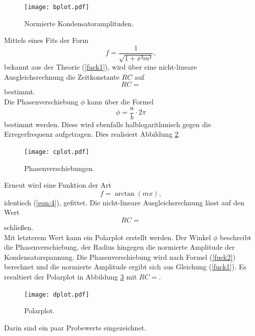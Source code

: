 \begin{figure}[H]
  \centering
  \texttt{[image: bplot.pdf]}
  \caption{Normierte Kondensatoramplituden.}
  \label{abb:3}
\end{figure}

Mittels eines Fits der Form
\begin{equation}
  f = \frac{1}{\sqrt{1+x²m²}},
\end{equation}
bekannt aus der Theorie (\ref{fuck1}), wird über eine nicht-lineare Ausgleichsrechnung die Zeitkonstante $RC$ auf
\begin{equation}
  RC = 
\end{equation}
bestimmt.\\
Die Phasenverschiebung $\phi$ kann über die Formel
\begin{equation}
  \phi = \frac{a}{b} \cdot 2\pi
\end{equation}
bestimmt werden.
Diese wird ebenfalls halblogarithmisch gegen die Erregerfrequenz aufgetragen.
Dies realisiert Abbildung \ref{abb:4}.

\begin{figure}[H]
  \centering
  \texttt{[image: cplot.pdf]}
  \caption{Phasenverschiebungen.}
  \label{abb:4}
\end{figure}

Erneut wird eine Funktion der Art
\begin{equation}
  f = \arctan(mx),
\end{equation}
identisch (\ref{eqn:4}), gefittet.
Die nicht-lineare Ausgleichsrechnung lässt auf den Wert
\begin{equation}
  RC = 
\end{equation}
schließen.\\
Mit letzterem Wert kann ein Polarplot erstellt werden.
Der Winkel $\phi$ beschreibt die Phasenverschiebung, der Radius hingegen die normierte Amplitude der Kondensatorspannung.
Die Phasenverschiebung wird nach Formel (\ref{fuck2}) berechnet und die normierte Amplitude ergibt sich aus Gleichung (\ref{fuck1}).
Es resultiert der Polarplot in Abbildung \ref{abb:5} mit $RC = $.

\begin{figure}[H]
  \centering
  \texttt{[image: dplot.pdf]}
  \caption{Polarplot.}
  \label{abb:5}
\end{figure}

Darin sind ein paar Probewerte eingezeichnet.

